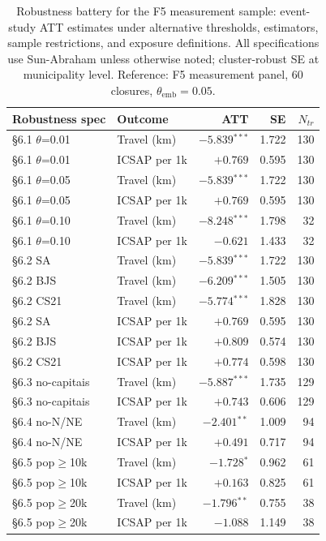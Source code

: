 \begin{table}[h!]
\centering
\caption{Robustness battery for the F5 measurement sample: event-study ATT estimates under alternative thresholds, estimators, sample restrictions, and exposure definitions. All specifications use Sun-Abraham unless otherwise noted; cluster-robust SE at municipality level. Reference: F5 measurement panel, 60 closures, $\theta_{\text{emb}}=0.05$.}
\label{tab:robustness}
\small
\begin{tabular}{llrrr}
\toprule
Robustness spec & Outcome & ATT & SE & $N_{tr}$ \\
\midrule
\S6.1 $\theta$=0.01 & Travel (km) & $-5.839$$^{***}$ & 1.722 & 130 \\
\S6.1 $\theta$=0.01 & ICSAP per 1k & $+0.769$ & 0.595 & 130 \\
\S6.1 $\theta$=0.05 & Travel (km) & $-5.839$$^{***}$ & 1.722 & 130 \\
\S6.1 $\theta$=0.05 & ICSAP per 1k & $+0.769$ & 0.595 & 130 \\
\S6.1 $\theta$=0.10 & Travel (km) & $-8.248$$^{***}$ & 1.798 & 32 \\
\S6.1 $\theta$=0.10 & ICSAP per 1k & $-0.621$ & 1.433 & 32 \\
\S6.2 SA & Travel (km) & $-5.839$$^{***}$ & 1.722 & 130 \\
\S6.2 BJS & Travel (km) & $-6.209$$^{***}$ & 1.505 & 130 \\
\S6.2 CS21 & Travel (km) & $-5.774$$^{***}$ & 1.828 & 130 \\
\S6.2 SA & ICSAP per 1k & $+0.769$ & 0.595 & 130 \\
\S6.2 BJS & ICSAP per 1k & $+0.809$ & 0.574 & 130 \\
\S6.2 CS21 & ICSAP per 1k & $+0.774$ & 0.598 & 130 \\
\S6.3 no-capitais & Travel (km) & $-5.887$$^{***}$ & 1.735 & 129 \\
\S6.3 no-capitais & ICSAP per 1k & $+0.743$ & 0.606 & 129 \\
\S6.4 no-N/NE & Travel (km) & $-2.401$$^{**}$ & 1.009 & 94 \\
\S6.4 no-N/NE & ICSAP per 1k & $+0.491$ & 0.717 & 94 \\
\S6.5 pop$\geq$10k & Travel (km) & $-1.728$$^{*}$ & 0.962 & 61 \\
\S6.5 pop$\geq$10k & ICSAP per 1k & $+0.163$ & 0.825 & 61 \\
\S6.5 pop$\geq$20k & Travel (km) & $-1.796$$^{**}$ & 0.755 & 38 \\
\S6.5 pop$\geq$20k & ICSAP per 1k & $-1.088$ & 1.149 & 38 \\

\end{tabular}
\end{table}

